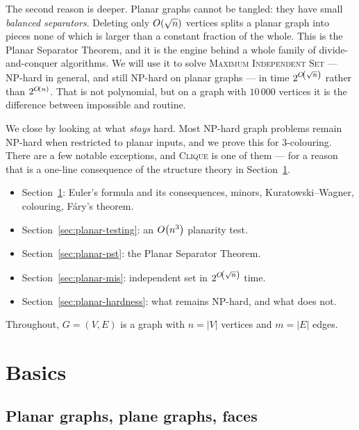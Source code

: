The second reason is deeper. Planar graphs cannot be tangled: they have small
\emph{balanced separators}. Deleting only $O\!\left(\sqrt{n}\right)$ vertices splits a
planar graph into pieces none of which is larger than a constant fraction of
the whole. This is the Planar Separator Theorem, and it is the engine behind a
whole family of divide-and-conquer algorithms. We will use it to solve
\textsc{Maximum Independent Set} --- NP-hard in general, and still NP-hard on
planar graphs --- in time $2^{O\!\left(\sqrt{n}\right)}$ rather than $2^{O\!\left(n\right)}$.
That is not polynomial, but on a graph with $10\,000$ vertices it is the
difference between impossible and routine.

We close by looking at what \emph{stays} hard. Most NP-hard graph problems
remain NP-hard when restricted to planar inputs, and we prove this for
$3$-colouring. There are a few notable exceptions, and \textsc{Clique} is one
of them --- for a reason that is a one-line consequence of the structure theory
in Section~\ref{sec:planar-basics}.

\begin{itemize}[nosep]
  \item Section~\ref{sec:planar-basics}: Euler's formula and its consequences, minors,
        Kuratowski--Wagner, colouring, Fáry's theorem.
  \item Section~\ref{sec:planar-testing}: an $O\!\left(n^3\right)$ planarity test.
  \item Section~\ref{sec:planar-pst}: the Planar Separator Theorem.
  \item Section~\ref{sec:planar-mis}: independent set in $2^{O\!\left(\sqrt n\right)}$ time.
  \item Section~\ref{sec:planar-hardness}: what remains NP-hard, and what does not.
\end{itemize}

Throughout, $G = (V,E)$ is a graph with $n = |V|$ vertices and $m = |E|$ edges.

\section{Basics}\label{sec:planar-basics}

\subsection{Planar graphs, plane graphs, faces}

